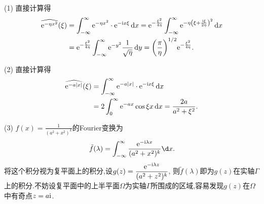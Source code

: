 \begin{solution}
  (1) 直接计算得
  \begin{align*}
    \widehat{\mathrm{e}^{-\eta x^2}}(\xi)
    & = \int_{-\infty}^{\infty} \mathrm{e}^{-\eta x^2}\cdot \mathrm{e}^{-\mathrm{i} x\xi}\mathop{}\!\mathrm{d} x
      = \mathrm{e}^{-\frac{\xi^2}{4\eta}} \int_{-\infty}^{\infty}
      \mathrm{e}^{-\eta\left(\xi+\frac{\mathrm{i}\xi}{2\eta}\right)^2} \mathop{}\!\mathrm{d} x \\
    & = \mathrm{e}^{-\frac{\xi^2}{4\eta}} \int_{-\infty}^{\infty}
      \mathrm{e}^{-y^2} \frac{1}{\sqrt{\eta}} \mathop{}\!\mathrm{d} y
      = \biggl(\frac{\pi}{\eta}\biggr)^{1/2} \mathrm{e}^{-\frac{\xi^2}{4\eta}}.
    \end{align*}

  (2) 直接计算得
  \begin{align*}
    \widehat{\mathrm{e}^{-a|x|}} (\xi)
    & = \int_{-\infty}^{\infty} \mathrm{e}^{-a|x|}\cdot\mathrm{e}^{-\mathrm{i} x\xi} \mathop{}\!\mathrm{d} x \\
    & = 2\int_0^{\infty} \mathrm{e}^{-ax} \cos\xi x \mathop{}\!\mathrm{d} x = \frac{2a}{a^2+\xi^2}.
  \end{align*}
  
	(3) $\displaystyle f(x)=\frac 1{(a^{2}+ x^{2})^{k}}$的Fourier变换为
	$$\tilde{f}(\lambda)=\int_{-\infty}^\infty\frac{\e^{-\upi\lambda x}}{(a^2+x^2)^k}\d x.$$
	将这个积分视为复平面上的积分,设$\displaystyle g(z)=\frac{\mathrm{e}^{-\mathrm{i}\lambda z}}{(a^2+z^2)^k}$,  则$\tilde{f}(\lambda)$即为$g(z)$在实轴$\varGamma$上的积分.不妨设复平面中的上半平面$\varOmega$为实轴$\varGamma$所围成的区域,容易发现$g(z)$在$\varOmega$中有奇点$z=a\mathrm{i}$.
  

\end{solution}

